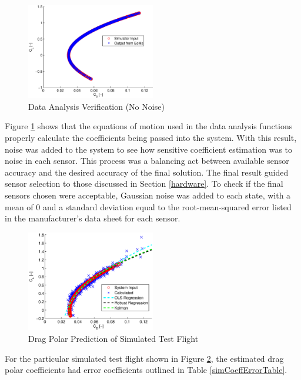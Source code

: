 \begin{figure}[h!]
  \caption{Data Analysis Verification (No Noise)} \label{dragPolarNoNoise}
  \centering
    \includegraphics[width=0.5\textwidth]{figures/dragPolarNoNoise.eps}
\end{figure}

Figure \ref{dragPolarNoNoise} shows that the equations of motion used in the data analysis functions properly calculate the coefficients being passed into the system. With this result, noise was added to the system to see how sensitive coefficient estimation was to noise in each sensor. This process was a balancing act between available sensor accuracy and the desired accuracy of the final solution. The final result guided sensor selection to those discussed in Section \ref{hardware}. To check if the final sensors chosen were acceptable, Gaussian noise was added to each state, with a mean of $0$ and a standard deviation equal to the root-mean-squared error listed in the manufacturer's data sheet for each sensor.
\begin{figure}[H]
  \caption{Drag Polar Prediction of Simulated Test Flight} \label{dragPolarNoise}
  \centering
    \includegraphics[width=0.5\textwidth]{figures/simDragPolarNoise.eps}
\end{figure}

For the particular simulated test flight shown in Figure \ref{dragPolarNoise}, the estimated drag polar coefficients had error coefficients outlined in Table \ref{simCoeffErrorTable}.

